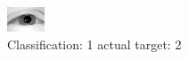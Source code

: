\begin{figure}[h!]
\begin{center}
\includegraphics[width=0.60\columnwidth]{figures/ID2335_class_1_target_2.png}
\end{center}
\caption{ Classification: 1 actual target: 2}
\label{fig:ID2335_class_1_target_2}
\end{figure}
